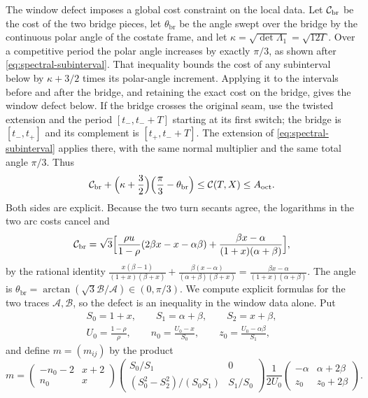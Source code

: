The window defect imposes a global cost constraint on the local data. Let $\mathcal{C}_{\mathrm{br}}$ be the cost of the two
bridge pieces, let $\theta_{\mathrm{br}}$ be the angle swept over the bridge by the continuous
polar angle of the costate frame, and let $\kappa=\sqrt{\det\Lambda_1}=\sqrt{12\Gamma}$. Over a
competitive period the polar angle increases by exactly $\pi/3$, as shown after
\eqref{eq:spectral-subinterval}. That inequality bounds the cost of any subinterval below by
$\kappa+3/2$ times its polar-angle increment. Applying it to the intervals before and after
the bridge, and retaining the exact cost on the bridge, gives the window defect below.
If the bridge crosses the original seam, use the twisted extension and the period
$[t_-,t_-+T]$ starting at its first switch; the bridge is $[t_-,t_+]$ and its complement is
$[t_+,t_-+T]$. The extension of \eqref{eq:spectral-subinterval} applies there, with the same
normal multiplier and the same total angle $\pi/3$. Thus
\begin{equation}\label{eq:ss-defect}
  \mathcal{C}_{\mathrm{br}}+\Bigl(\kappa+\frac32\Bigr)\Bigl(\frac\pi3-\theta_{\mathrm{br}}\Bigr)
  \le\mathcal{C}(T,X)\le A_{\mathrm{oct}} .
\end{equation}
Both sides are explicit.
Because the two turn secants agree, the logarithms in the two arc costs cancel and
\begin{equation}\label{eq:ss-cost}
  \mathcal{C}_{\mathrm{br}}=\sqrt3\Bigl[\frac{\rho u}{1-\rho}(2\beta x-x-\alpha\beta)
   +\frac{\beta x-\alpha}{(1+x)(\alpha+\beta)}\Bigr],
\end{equation}
by the rational identity
$\frac{x(\beta-1)}{(1+x)(\beta+x)}+\frac{\beta(x-\alpha)}{(\alpha+\beta)(\beta+x)}
=\frac{\beta x-\alpha}{(1+x)(\alpha+\beta)}$. The angle is
$\theta_{\mathrm{br}}=\arctan(\sqrt3\mathcal B/\mathcal A)\in(0,\pi/3)$.
We compute explicit formulas for the two traces $\mathcal A,\mathcal B$, so the defect is an
inequality in the window data alone. Put
\begin{gather*}
 S_0=1+x,\qquad S_1=\alpha+\beta,\qquad S_2=x+\beta,\\
 U_0=\frac{1-\rho}{\rho},\qquad n_0=\frac{U_0-x}{S_0},\qquad
 z_0=\frac{U_0-\alpha\beta}{S_1},
\end{gather*}
and define $m=(m_{ij})$ by the product
\begin{equation}\label{eq:ss-bridge-frame}
 m=\begin{pmatrix}-n_0-2&x+2\\n_0&x\end{pmatrix}
 \begin{pmatrix}S_0/S_1&0\\(S_0^2-S_2^2)/(S_0S_1)&S_1/S_0\end{pmatrix}
 \frac1{2U_0}\begin{pmatrix}-\alpha&\alpha+2\beta\\z_0&z_0+2\beta\end{pmatrix}.
\end{equation}
